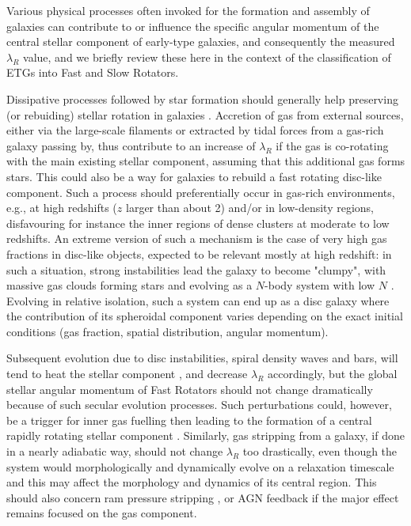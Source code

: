 \documentclass[useAMS,usenatbib,usegraphicx]{mn2e}
\begin{document}
Various physical processes often invoked for the formation and assembly of galaxies can
contribute to or influence the specific angular momentum of the central stellar component
of early-type galaxies, and consequently the measured $\lambda_R$ value, and we
briefly review these here in the context of the classification of ETGs into Fast and Slow Rotators.

Dissipative processes followed by star formation should generally help
preserving (or rebuiding) stellar rotation in galaxies \citep[see e.g., an early
discussion in the context of early-type galaxies in][]{Bender+92}.
Accretion of gas from external sources, either via the large-scale filaments
\citep[e.g.][]{Sancisi+08,Dekel+09, KhochfarSilk09} 
or extracted by tidal forces from a gas-rich galaxy passing by, 
thus contribute to an increase of $\lambda_R$ if the gas is 
co-rotating with the main existing stellar component, assuming
that this additional gas forms stars. 
This could also be a way for galaxies to rebuild a fast rotating disc-like component.
Such a process should preferentially occur in gas-rich environments, e.g., at high redshifts ($z$ larger than about 2) 
and/or in low-density regions, disfavouring for instance the inner regions of dense clusters at moderate to low redshifts.
An extreme version of such a mechanism is the case of very high gas fractions in disc-like objects, expected to be relevant
mostly at high redshift: in such a situation, strong instabilities lead the 
galaxy to become "clumpy", with massive gas clouds
forming stars and evolving as a $N$-body system with low $N$ \citep[see e.g.][]{Elmegreen+08,Elmegreen+09}. 
Evolving in relative isolation, such a system can end up as a disc galaxy \citep[a
Fast Rotator, e.g.][]{Bournaud+08} where the contribution of its spheroidal component varies depending 
on the exact initial conditions (gas fraction, spatial distribution, angular momentum). 

Subsequent evolution due to disc instabilities, spiral density waves and bars, 
will tend to heat the stellar component \citep{SellwoodBinney02,Debattista+06, Sales+09, Minchev+10},
and decrease $\lambda_R$ accordingly, but the global stellar angular momentum of Fast Rotators 
should not change dramatically because of such secular evolution processes. 
Such perturbations could, however, be a trigger for inner gas fuelling then 
leading to the formation of a central rapidly rotating stellar
component \citep[e.g.][]{Wozniak+03}. 
Similarly, gas stripping from a galaxy, if done in a nearly adiabatic
way, should not change $\lambda_R$ too drastically, even though the system 
would morphologically and dynamically evolve on a relaxation timescale and this
may affect the morphology and dynamics of its central region.
This should also concern ram pressure stripping \citep{GunnGott72, Quilis+00,
Rasmussen+06}, or AGN feedback if the major effect remains focused
on the gas component.
\end{document}
